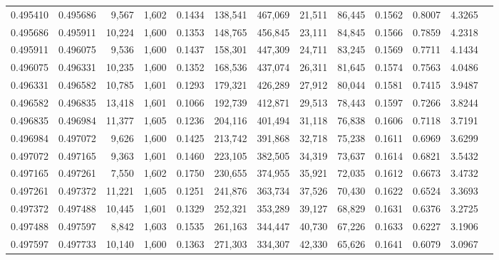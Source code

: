 \begin{tabular}{rrrrrrrrrrrrr}
0.495410 & 0.495686 &  9,567 & 1,602 &                                     0.1434 & 138,541 & 467,069 &  21,511 &  86,445 & 0.1562 & 0.8007 & 4.3265 \\
0.495686 & 0.495911 & 10,224 & 1,600 &                                     0.1353 & 148,765 & 456,845 &  23,111 &  84,845 & 0.1566 & 0.7859 & 4.2318 \\
0.495911 & 0.496075 &  9,536 & 1,600 &                                     0.1437 & 158,301 & 447,309 &  24,711 &  83,245 & 0.1569 & 0.7711 & 4.1434 \\
0.496075 & 0.496331 & 10,235 & 1,600 &                                     0.1352 & 168,536 & 437,074 &  26,311 &  81,645 & 0.1574 & 0.7563 & 4.0486 \\
0.496331 & 0.496582 & 10,785 & 1,601 &                                     0.1293 & 179,321 & 426,289 &  27,912 &  80,044 & 0.1581 & 0.7415 & 3.9487 \\
0.496582 & 0.496835 & 13,418 & 1,601 &                                     0.1066 & 192,739 & 412,871 &  29,513 &  78,443 & 0.1597 & 0.7266 & 3.8244 \\
0.496835 & 0.496984 & 11,377 & 1,605 &                                     0.1236 & 204,116 & 401,494 &  31,118 &  76,838 & 0.1606 & 0.7118 & 3.7191 \\
0.496984 & 0.497072 &  9,626 & 1,600 &                                     0.1425 & 213,742 & 391,868 &  32,718 &  75,238 & 0.1611 & 0.6969 & 3.6299 \\
0.497072 & 0.497165 &  9,363 & 1,601 &                                     0.1460 & 223,105 & 382,505 &  34,319 &  73,637 & 0.1614 & 0.6821 & 3.5432 \\
0.497165 & 0.497261 &  7,550 & 1,602 &                                     0.1750 & 230,655 & 374,955 &  35,921 &  72,035 & 0.1612 & 0.6673 & 3.4732 \\
0.497261 & 0.497372 & 11,221 & 1,605 &                                     0.1251 & 241,876 & 363,734 &  37,526 &  70,430 & 0.1622 & 0.6524 & 3.3693 \\
0.497372 & 0.497488 & 10,445 & 1,601 &                                     0.1329 & 252,321 & 353,289 &  39,127 &  68,829 & 0.1631 & 0.6376 & 3.2725 \\
0.497488 & 0.497597 &  8,842 & 1,603 &                                     0.1535 & 261,163 & 344,447 &  40,730 &  67,226 & 0.1633 & 0.6227 & 3.1906 \\
0.497597 & 0.497733 & 10,140 & 1,600 &                                     0.1363 & 271,303 & 334,307 &  42,330 &  65,626 & 0.1641 & 0.6079 & 3.0967 \\

\end{tabular}
